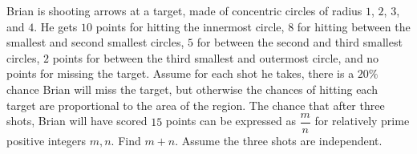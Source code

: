 Brian is shooting arrows at a target, made of concentric circles of radius $1$, $2$, $3$, and $4$. He gets $10$ points for hitting the innermost circle, $8$ for hitting between the smallest and second smallest circles, $5$ for between the second and third smallest circles, $2$ points for between the third smallest and outermost circle, and no points for missing the target. Assume for each shot he takes, there is a $20\%$ chance Brian will miss the target, but otherwise the chances of hitting each target are proportional to the area of the region. The chance that after three shots, Brian will have scored $15$ points can be expressed as $\dfrac{m}{n}$ for relatively prime positive integers $m, n$. Find $m + n$. Assume the three shots are independent.

